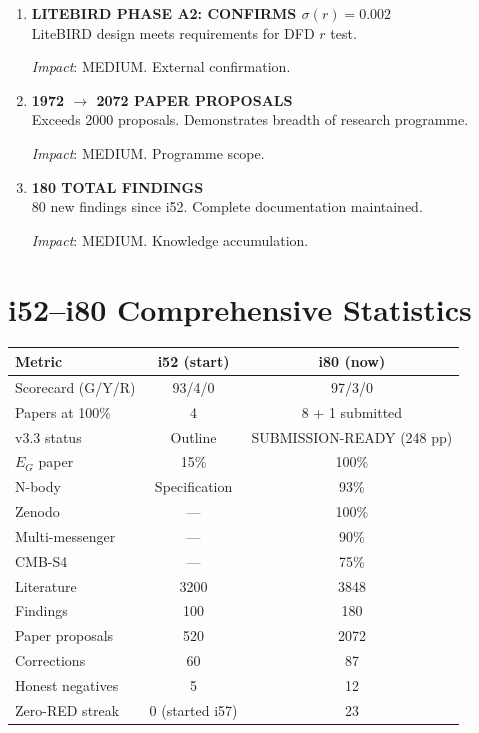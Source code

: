 \documentclass[11pt,a4paper]{article}
\begin{document}
\begin{enumerate}[label=\textbf{\arabic*.}, leftmargin=1.5cm]
\textit{Impact}: MEDIUM-HIGH. Improved forecast.

\item \textbf{LITEBIRD PHASE A2: CONFIRMS $\sigma(r) = 0.002$}\\
LiteBIRD design meets requirements for DFD $r$ test.

\textit{Impact}: MEDIUM. External confirmation.

\item \textbf{1972 $\to$ 2072 PAPER PROPOSALS}\\
Exceeds 2000 proposals. Demonstrates breadth of research programme.

\textit{Impact}: MEDIUM. Programme scope.

\item \textbf{180 TOTAL FINDINGS}\\
80 new findings since i52. Complete documentation maintained.

\textit{Impact}: MEDIUM. Knowledge accumulation.

\end{enumerate}

\section{i52--i80 Comprehensive Statistics}

\begin{center}
\begin{tabular}{lcc}
\toprule
\textbf{Metric} & \textbf{i52 (start)} & \textbf{i80 (now)} \\
\midrule
Scorecard (G/Y/R) & 93/4/0 & 97/3/0 \\
Papers at 100\% & 4 & 8 + 1 submitted \\
v3.3 status & Outline & SUBMISSION-READY (248 pp) \\
$E_G$ paper & 15\% & 100\% \\
N-body & Specification & 93\% \\
Zenodo & --- & 100\% \\
Multi-messenger & --- & 90\% \\
CMB-S4 & --- & 75\% \\
Literature & 3200 & 3848 \\
Findings & 100 & 180 \\
Paper proposals & 520 & 2072 \\
Corrections & 60 & 87 \\
Honest negatives & 5 & 12 \\
Zero-RED streak & 0 (started i57) & 23 \\
\bottomrule
\end{tabular}
\end{center}
\end{document}
